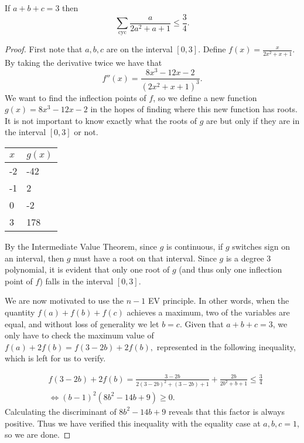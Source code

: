 \documentclass[letterpaper,oneside]{scrartcl}
\begin{document}
\newpage
\begin{problem*}
  If \(a+b+c=3\) then
  \[\sum_{\text{cyc}} \frac{a}{2a^2+a+1} \leq \frac34.\]
\end{problem*}
\begin{proof}
  First note that \(a,b,c\) are on the interval \([0,3]\).
  Define \(f(x) = \frac{x}{2x^2+x+1}.\) By taking the derivative twice we have that
  \[f''(x) = \frac{8x^3-12x-2}{\left(2x^2+x+1\right)^3}.\]
  We want to find the inflection points of \(f\), so we define a new function
  \(g(x) = 8x^3-12x-2\) in the hopes of finding where this new function has roots. It is not important to know exactly what the roots of \(g\) are but only if they are in the interval \([0,3]\) or not.

  \begin{table}[ht]
    \centering
    \begin{tabular}{|l|l|}
      \hline
      $x$ & $g(x)$ \\ \hline
      -2  & -42    \\ \hline
      -1  & 2      \\ \hline
      0   & -2     \\ \hline
      3   & 178    \\ \hline
    \end{tabular}
  \end{table}
  By the Intermediate Value Theorem, since \(g\) is continuous, if \(g\) switches sign on an interval, then \(g\) must have a root on that interval. Since \(g\) is a degree 3 polynomial, it is evident that only one root of \(g\) (and thus only one inflection point of \(f\)) falls in the interval \([0,3].\)

  We are now motivated to use the \(n-1\) EV principle. In other words, when the quantity \(f(a)+f(b)+f(c)\) achieves a maximum, two of the variables are equal, and without loss of generality we let \(b=c\). Given that \(a+b+c=3\), we only have to check the maximum value of \(f(a)+2f(b) = f(3-2b) + 2f(b),\) represented in the following inequality, which is left for us to verify.

  \begin{align*}
     & f(3-2b)+2f(b) = \frac{3-2b}{2(3-2b)^2+(3-2b)+1} + \frac{2b}{2b^2+b+1} \leq \frac34 \\
     & \Longleftrightarrow (b-1)^2(8b^2-14b+9) \geq 0.
  \end{align*}
  Calculating the discriminant of \(8b^2-14b+9\) reveals that this factor is always positive. Thus we have verified this inequality with the equality case at \(a,b,c=1\), so we are done.
\end{proof}
\end{document}
